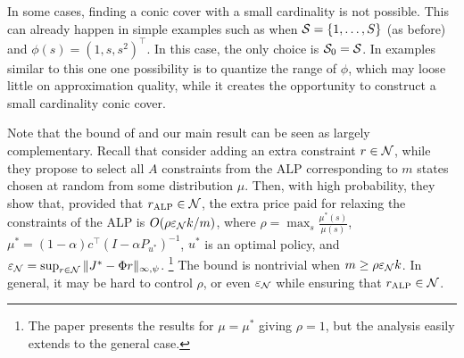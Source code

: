 \documentclass[12pt,draftcls,onecolumn]{IEEEtran}
\begin{document}
In some cases, finding a conic cover with a small cardinality is not possible. 
This can already happen in simple examples such as when $\S = \{1,\dots,S\}$ (as before) and
$\phi( s ) = (1,s,s^2)^\top$. In this case, the only choice is $\S_0 = \S$. 
In examples similar to this one one possibility is to quantize the range of $\phi$, which may  loose
little on approximation quality, while it creates the opportunity 
to construct a small cardinality conic cover.

Note that the bound of \cite{CS} and our main result can be seen as largely complementary. 
Recall that \citeauthor{CS} consider adding an extra constraint $r\in \N$, while they propose to select all $A$ constraints
from the ALP corresponding to $m$ states chosen at random from some distribution $\mu$. 
Then, with high probability,
they show that, provided that $\ralp \in \N$,
 the extra price paid for relaxing the constraints of the ALP is $O( \rho \epsilon_{\N} k/m)$,
 where $\rho = \max_{s} \frac{\mu^*(s)}{\mu(s)}$, $\mu^* = (1-\alpha)c^\top (I-\alpha P_{u^*})^{-1}$, $u^*$ is an optimal policy,
and $\epsilon_{\N} = \sup_{r\in \N} \norm{J^*-\Phi r}_{\infty,\psi}$.%
\footnote{The paper presents the results for $\mu = \mu^*$ giving $\rho=1$, but the analysis easily extends to the general case.}
The bound is nontrivial when $m\ge \rho \epsilon_{\N} k$.
In general, it may be hard to control $\rho$, or even $\epsilon_{\N}$ while ensuring that $\ralp \in \N$.
\end{document}
